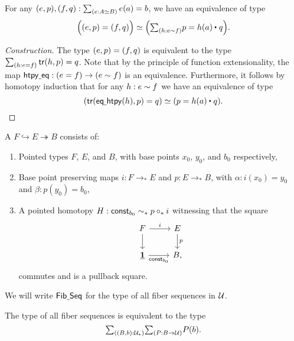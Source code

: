 \begin{lem}\label{lem:equiv_of_ptdequiv}
For any $\pairr{e,p},\pairr{f,q}:\sm{e:\eqv{A}{B}}e(a)=b$, we have an equivalence of type
\begin{equation*}
\eqv{\Big(\pairr{e,p}=\pairr{f,q}\Big)}{\Big(\sm{h:e\htpy f} p=\ct{h(a)}{q}\Big)}.
\end{equation*}
\end{lem}

\begin{proof}[Construction]
The type ${\mathopen{}(e,p)\mathclose{}}={\mathopen{}(f,q)\mathclose{}}$ is equivalent
to the type $\sm{h:e=f}\tr({h},{p})=q$.
Note that by the principle of function extensionality,
the map $\mathsf{htpy\underline{\ }{}eq}:(e=f)\to(e\sim f)$
is an equivalence. Furthermore, it follows by homotopy induction that for any 
$h:e\sim f$ we have an equivalence of type
\begin{equation*}
\eqv{(\tr({\eqhtpy(h)},{p})=q)}
    {(p= \ct{h(a)}{q})}.\qedhere
\end{equation*}
\end{proof}

\begin{defn}
A  $F\hookrightarrow E \twoheadrightarrow B$ consists of:
\begin{enumerate}
\item Pointed types $F$, $E$, and $B$, with base points $x_0$, $y_0$, and $b_0$ respectively, 
\item Base point preserving maps $i:F\to_\ast E$ and $p:E\to_\ast B$, with $\alpha:i(x_0)=y_0$ and $\beta:p(y_0)=b_0$,
\item A pointed homotopy $H:\mathsf{const}_{b_0}\sim_\ast p\circ_\ast i$ witnessing that the square
\begin{equation*}
\begin{tikzcd}
F \arrow[r,"i"] \arrow[d] & E \arrow[d,"p"] \\
\unit \arrow[r,swap,"\const_{b_0}"] & B,
\end{tikzcd}
\end{equation*}
commutes and is a pullback square.
\end{enumerate}
We will write $\mathsf{Fib\underline{\ }{}Seq}$ for the type of all fiber sequences in $\mathcal{U}$.
\end{defn}

\begin{prp}
The type of all fiber sequences is equivalent to the type
\begin{equation*}
\sm{(B,b):\UU_\ast}{P:B\to\UU}P(b).
\end{equation*}
\end{prp}


